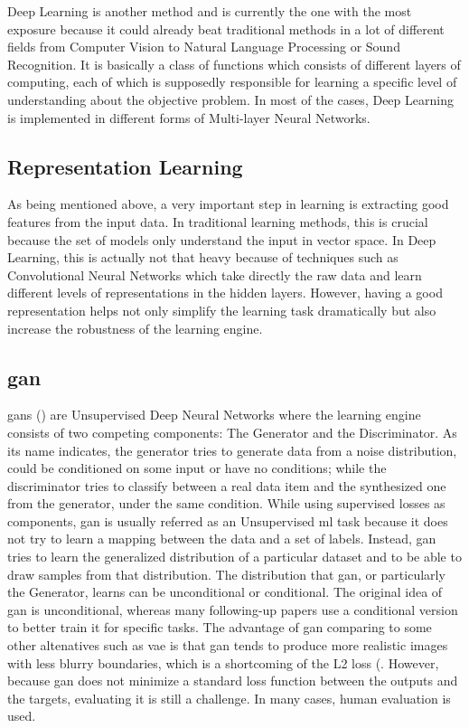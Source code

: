 Deep Learning is another method and is currently the one with the most exposure because it
could already beat traditional methods in a lot of different fields from Computer Vision
to Natural Language Processing or Sound Recognition. It is basically a class of functions
which consists of different layers of computing, each of which is supposedly responsible
for learning a specific level of understanding about the objective problem. In most of the
cases, Deep Learning is implemented in different forms of Multi-layer Neural Networks.

\subsection{Representation Learning}
As being mentioned above, a very important step in learning is extracting good features
from the input data. In traditional learning methods, this is crucial because the set of
models only understand the input in vector space. In Deep Learning, this is actually not
that heavy because of techniques such as Convolutional Neural Networks which take directly
the raw data and learn different levels of representations in the hidden layers. However,
having a good representation helps not only simplify the learning task dramatically but
also increase the robustness of the learning engine.

\subsection{\acrfull{gan}}
\acrlong{gan}s () are Unsupervised Deep Neural Networks where the learning
engine consists of two competing components: The Generator and the Discriminator. As its
name indicates, the generator tries to generate data from a noise distribution, could be
conditioned on some input or have no conditions; while the discriminator tries to classify
between a real data item and the synthesized one from the generator, under the same
condition. While using supervised losses as components, \acrshort{gan} is usually referred
as an Unsupervised \acrshort{ml} task because it does not try to learn a mapping between
the data and a set of labels. Instead, \acrshort{gan} tries to learn the generalized
distribution of a particular dataset and to be able to draw samples from that
distribution. The distribution that \acrshort{gan}, or particularly the Generator, learns
can be unconditional or conditional. The original idea of \acrshort{gan} is unconditional,
whereas many following-up papers use a conditional version to better train it for specific
tasks. The advantage of \acrshort{gan} comparing to some other altenatives such as
\acrfull{vae}  is that \acrshort{gan} tends to produce more realistic images with less
blurry boundaries, which is a shortcoming of the L2 loss (.
However, because \acrshort{gan} does not minimize a standard loss function between the
outputs and the targets, evaluating it is still a challenge. In many cases, human
evaluation is used.

